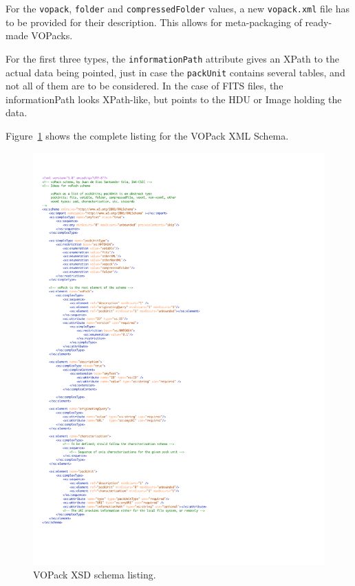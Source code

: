 			For the \texttt{vopack}, \texttt{folder} and
			\texttt{compressedFolder} values, a new
			\texttt{vopack.xml} file has to be provided for their
			description. This allows for meta-packaging of
			ready-made VOPacks.
			
			 For the first three types, the
			\texttt{informationPath} attribute gives an XPath to
			the actual data being pointed, just in case the
			\texttt{packUnit} contains several tables, and not all
			of them are to be considered. In the case of FITS
			files, the informationPath looks XPath-like, but points
			to the HDU or Image holding the data.
			
			 Figure~\ref{figVOPackXSDfile} shows the complete
			listing for the VOPack XML Schema.
			
			\begin{figure}[tbp]
			\begin{center}
				\includegraphics[totalheight=1\textheight]
				{fig/vopack-schemaListing.pdf}
			\end{center}
			\caption[VOPack schema listing]
			{VOPack XSD schema listing.}
			\label{figVOPackXSDfile}
			\end{figure}
			
